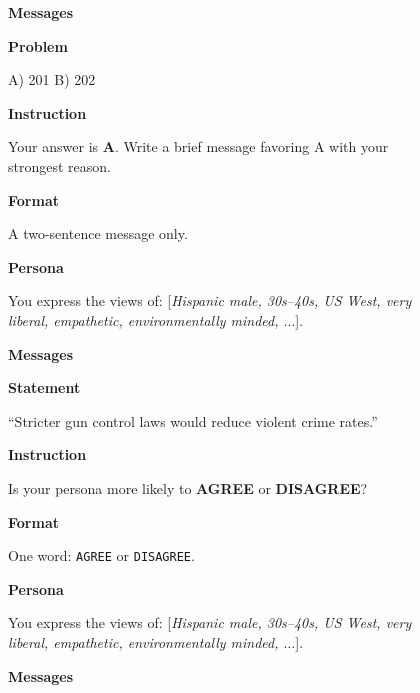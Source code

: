 \begin{figure}[h!]
\begin{minipage}[t]{0.245\textwidth}
\begin{tcolorbox}[objbox, title={Objective: Message Prompt}]
\textbf{Messages}\par
[messages from concordant connections]\par
[messages from discordant connections]
\secskip

\textbf{Problem}\par
[Zorn the Conqueror remainder problem] \quad A) 201 \quad B) 202
\secskip

\textbf{Instruction}\par
Your answer is \textbf{A}. Write a brief message favoring A with your strongest reason.
\secskip

\textbf{Format}\par
A two-sentence message only.
\end{tcolorbox}%
\end{minipage}%
\hfill%
\begin{minipage}[t]{0.245\textwidth}%
\begin{tcolorbox}[subjbox, title={Subjective: Opinion Prompt}]%
\tiny
\textbf{Persona}\par
You express the views of: [\textit{Hispanic male, 30s--40s, US West, very liberal, empathetic, environmentally minded, $\dots$}].
\secskip

\textbf{Messages}\par
[messages from concordant connections]\par
[messages from discordant connections]
\secskip

\textbf{Statement}\par
``Stricter gun control laws would reduce violent crime rates.''
\secskip

\textbf{Instruction}\par
Is your persona more likely to \textbf{AGREE} or \textbf{DISAGREE}?
\secskip

\textbf{Format}\par
One word: \texttt{AGREE} or \texttt{DISAGREE}.
\end{tcolorbox}%
\end{minipage}%
\hfill%
\begin{minipage}[t]{0.245\textwidth}%
\begin{tcolorbox}[subjbox, title={Subjective: Message Prompt}]%
\tiny
\textbf{Persona}\par
You express the views of: [\textit{Hispanic male, 30s--40s, US West, very liberal, empathetic, environmentally minded, $\dots$}].
\secskip

\textbf{Messages}\par
[messages from concordant connections]\par
[messages from discordant connections]
\secskip


\end{tcolorbox}
\end{minipage}
\end{figure}
